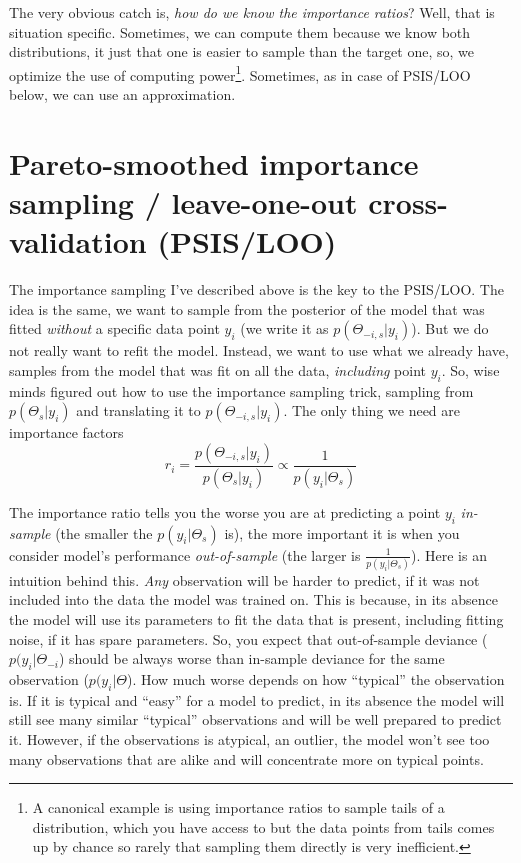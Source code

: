 \documentclass[
]{book}
\begin{document}
The very obvious catch is, \emph{how do we know the importance ratios}? Well, that is situation specific. Sometimes, we can compute them because we know both distributions, it just that one is easier to sample than the target one, so, we optimize the use of computing power\footnote{A canonical example is using importance ratios to sample tails of a distribution, which you have access to but the data points from tails comes up by chance so rarely that sampling them directly is very inefficient.}. Sometimes, as in case of PSIS/LOO below, we can use an approximation.

\hypertarget{pareto-smoothed-importance-sampling-leave-one-out-cross-validation-psisloo}{%
\section{Pareto-smoothed importance sampling / leave-one-out cross-validation (PSIS/LOO)}\label{pareto-smoothed-importance-sampling-leave-one-out-cross-validation-psisloo}}

The importance sampling I've described above is the key to the PSIS/LOO. The idea is the same, we want to sample from the posterior of the model that was fitted \emph{without} a specific data point \(y_i\) (we write it as \(p(\Theta_{-i,s}|y_i)\)). But we do not really want to refit the model. Instead, we want to use what we already have, samples from the model that was fit on all the data, \emph{including} point \(y_i\). So, wise minds figured out how to use the importance sampling trick, sampling from \(p(\Theta_s|y_i)\) and translating it to \(p(\Theta_{-i,s}|y_i)\). The only thing we need are importance factors
\[r_i = \frac{p(\Theta_{-i,s}|y_i)}{p(\Theta_s|y_i)} \propto \frac{1}{p(y_i|\Theta_s)}\]

The importance ratio tells you the worse you are at predicting a point \(y_i\) \emph{in-sample} (the smaller the \(p(y_i|\Theta_s)\) is), the more important it is when you consider model's performance \emph{out-of-sample} (the larger is \(\frac{1}{p(y_i|\Theta_s)}\)). Here is an intuition behind this. \emph{Any} observation will be harder to predict, if it was not included into the data the model was trained on. This is because, in its absence the model will use its parameters to fit the data that is present, including fitting noise, if it has spare parameters. So, you expect that out-of-sample deviance (\(p(y_i|\Theta_{-i}\)) should be always worse than in-sample deviance for the same observation (\(p(y_i|\Theta\)). How much worse depends on how ``typical'' the observation is. If it is typical and ``easy'' for a model to predict, in its absence the model will still see many similar ``typical'' observations and will be well prepared to predict it. However, if the observations is atypical, an outlier, the model won't see too many observations that are alike and will concentrate more on typical points.
\end{document}
